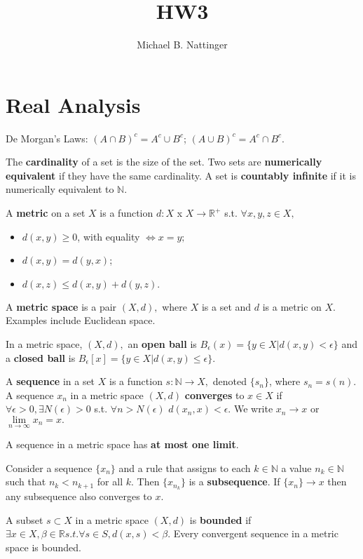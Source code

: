\documentclass[11pt]{article} %
\title{HW3}
\author{Michael B. Nattinger}
\begin{document}
\maketitle

\section{Real Analysis}
De Morgan's Laws: $(A \cap B)^c = A^c \cup B^c$; $(A \cup B)^c = A^c \cap B^c$.

The \textbf{cardinality} of a set is the size of the set. Two sets are \textbf{numerically equivalent} if they have the same cardinality. A set is \textbf{countably infinite} if it is numerically equivalent to $\mathbb{N}$.

A \textbf{metric} on a set $X$ is a function $d: X $ x $ X \rightarrow \mathbb{R}^+$ s.t. $\forall x,y,z \in X,$
\begin{itemize}
\item $d(x,y) \geq 0$, with equality $\iff x = y;$
\item $d(x,y) = d(y,x)$;
\item $d(x,z) \leq d(x,y) + d(y,z).$
\end{itemize}
A \textbf{metric space} is a pair $(X,d),$ where $X$ is a set and $d$ is a metric on $X$. Examples include Euclidean space.

In a metric space, $(X,d),$ an \textbf{open ball} is $B_\epsilon(x) = \{ y \in X| d(x,y) < \epsilon\}$ and a \textbf{closed ball} is $B_\epsilon[x] = \{ y \in X| d(x,y) \leq \epsilon\}$.

A \textbf{sequence} in a set $X$ is a function $s: \mathbb{N} \rightarrow X,$ denoted $\{ s_n\}$, where $s_n = s(n)$. A sequence $x_n$ in a metric space $(X,d)$ \textbf{converges} to $x \in X$ if $\forall \epsilon >0, \exists N(\epsilon)>0$ s.t. $\forall n>N(\epsilon)$ $d(x_n,x) < \epsilon.$ We write $x_n \rightarrow x$ or $\lim\limits_{n \rightarrow \infty} x_n = x.$

A sequence in a metric space has \textbf{at most one limit}.

Consider a sequence $\{ x_n\}$ and a rule that assigns to each $k \in \mathbb{N}$ a value $n_k \in \mathbb{N}$ such that $n_k <n_{k+1}$ for all $k$. Then $\{ x_{n_k}\}$ is a \textbf{subsequence}. If $\{x_n\} \rightarrow x$ then any subsequence also converges to $x$.

A subset $s \subset X$ in a metric space $(X,d)$ is \textbf{bounded} if $\exists x \in X, \beta \in \mathbb{R} s.t. \forall s \in S, d(x,s) < \beta.$ Every convergent sequence in a metric space is bounded.
\end{document}
